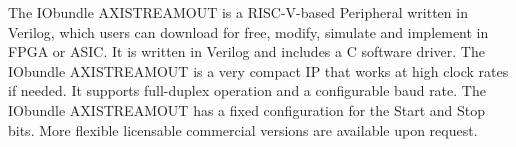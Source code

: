 The IObundle AXISTREAMOUT is a RISC-V-based Peripheral written in Verilog, which users
can download for free, modify, simulate and implement in FPGA or ASIC. It is
written in Verilog and includes a C software driver. The IObundle AXISTREAMOUT is a very
compact IP that works at high clock rates if needed. It supports full-duplex
operation and a configurable baud rate. The IObundle AXISTREAMOUT has a fixed
configuration for the Start and Stop bits. More flexible licensable commercial
versions are available upon request.


